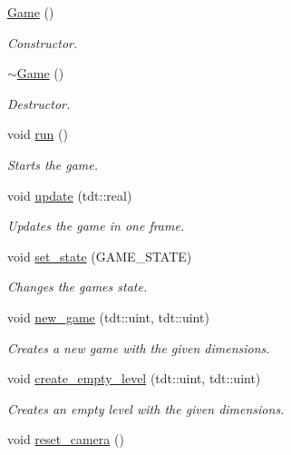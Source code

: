 \begin{DoxyCompactItemize}
\item 
\hyperlink{class_game_ad59df6562a58a614fda24622d3715b65}{Game} ()
\begin{DoxyCompactList}\small\item\em Constructor. \end{DoxyCompactList}\item 
\hyperlink{class_game_ae3d112ca6e0e55150d2fdbc704474530}{$\sim$\+Game} ()
\begin{DoxyCompactList}\small\item\em Destructor. \end{DoxyCompactList}\item 
void \hyperlink{class_game_a1ab78f5ed0d5ea879157357cf2fb2afa}{run} ()
\begin{DoxyCompactList}\small\item\em Starts the game. \end{DoxyCompactList}\item 
void \hyperlink{class_game_a484567626eb22fe9fc65c51a3914e230}{update} (tdt\+::real)
\begin{DoxyCompactList}\small\item\em Updates the game in one frame. \end{DoxyCompactList}\item 
void \hyperlink{class_game_a5daa13180764435151f08925edd144a3}{set\+\_\+state} (G\+A\+M\+E\+\_\+\+S\+T\+A\+TE)
\begin{DoxyCompactList}\small\item\em Changes the game\textquotesingle{}s state. \end{DoxyCompactList}\item 
void \hyperlink{class_game_af379c92d7e4e03982bcbeb53f4d3edb5}{new\+\_\+game} (tdt\+::uint, tdt\+::uint)
\begin{DoxyCompactList}\small\item\em Creates a new game with the given dimensions. \end{DoxyCompactList}\item 
void \hyperlink{class_game_a57ad62417505d7230bc46b37def4f1d0}{create\+\_\+empty\+\_\+level} (tdt\+::uint, tdt\+::uint)
\begin{DoxyCompactList}\small\item\em Creates an empty level with the given dimensions. \end{DoxyCompactList}\item 
void \hyperlink{class_game_a4faa3b6fdf7446e3e432d3a7cf49e6b2}{reset\+\_\+camera} ()

\end{DoxyCompactItemize}

